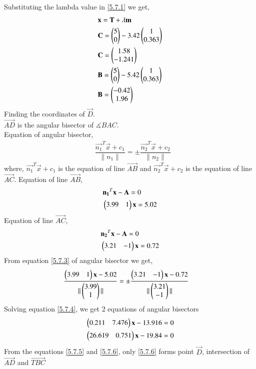 \documentclass[journal,12pt,twocolumn]{IEEEtran}
\renewcommand\thesection{\arabic{section}}
\begin{document}
\begin{enumerate}[label=\thesection.\arabic*.,ref=\thesection.\theenumi]
Substituting the lambda value in \eqref{5.7.1} we get,
\begin{align}
& \mathbf{x} = \mathbf{T} +\lambda\mathbf{m}\\
& \mathbf{C} = \begin{pmatrix}5\\0\end{pmatrix} -3.42\begin{pmatrix}1\\0.363\end{pmatrix}\\
& \mathbf{C} = \begin{pmatrix}1.58\\-1.241\end{pmatrix}\\
& \mathbf{B} = \begin{pmatrix}5\\0\end{pmatrix} -5.42\begin{pmatrix}1\\0.363\end{pmatrix}\\
& \mathbf{B} = \begin{pmatrix}-0.42\\1.96\end{pmatrix}
\end{align}
Finding the coordinates of $\vec{D}$.\\
$\vec{AD}$ is the angular bisector of $\measuredangle{BAC}$.\\
Equation of angular bisector,\\
\begin{align}
&\dfrac{\vec{n_1}^T\vec{x}+c_1}{\|n_1\|} = \pm \dfrac{\vec{n_2}^T\vec{x}+c_2}{\|n_2\|} \label{5.7.3}
\end{align}
where,
$\vec{n_1}^T\vec{x}+c_1$ is the equation of line $\vec{AB}$ and $\vec{n_2}^T\vec{x}+c_2$ is the equation of line $\vec{AC}$.
Equation of line $\vec{AB}$,
\begin{align}
& \mathbf{n_1}^T\mathbf{x-A} = 0\\
& \begin{pmatrix}3.99&1\end{pmatrix}\mathbf{x} = 5.02
\end{align}
Equation of line $\vec{AC}$,
\begin{align}
& \mathbf{n_2}^T\mathbf{x-A} = 0\\
& \begin{pmatrix}3.21&-1\end{pmatrix}\mathbf{x} = 0.72
\end{align}
 From equation \eqref{5.7.3} of angular bisector we get, 
\begin{align}
& \dfrac{\begin{pmatrix}3.99&1\end{pmatrix}\mathbf{x}-5.02}{\|\begin{pmatrix}3.99\\1\end{pmatrix}\|} = \pm \dfrac{ \begin{pmatrix}3.21&-1\end{pmatrix}\mathbf{x}-0.72}{\|\begin{pmatrix}3.21\\-1\end{pmatrix}\|} \label{5.7.4}
\end{align}
Solving equation \eqref{5.7.4}, we get 2 equations  of angular bisectors
\begin{align}
&  \begin{pmatrix}0.211&7.476\end{pmatrix}\mathbf{x}-13.916 = 0 \label{5.7.5}\\
&\begin{pmatrix}26.619&0.751\end{pmatrix}\mathbf{x}-19.84 = 0 \label{5.7.6}
\end{align}
From the equations \eqref{5.7.5} and \eqref{5.7.6}, only \eqref{5.7.6} forms point $\vec{D}$, intersection of $\vec{AD}$ and $\vec{TBC}$

\end{enumerate}
\end{document}
